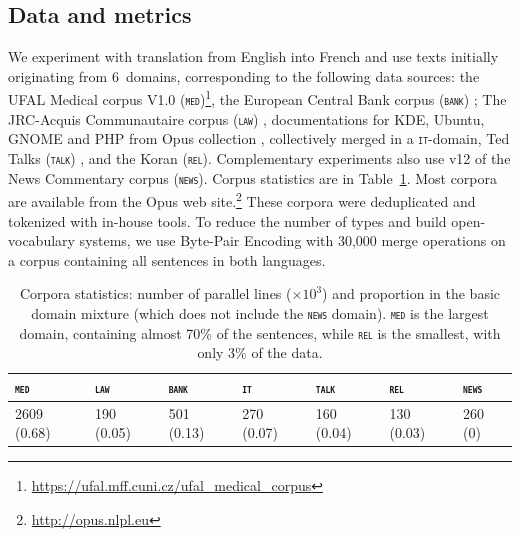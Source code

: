 \documentclass[11pt,a4paper]{article}
\newcommand{\domain}[1]{\texttt{\textsc{#1}}}
\begin{document}
\subsection{Data and metrics \label{ssec:corpora}}
We experiment with translation from English into French and use texts initially originating from 6~domains, corresponding to the following data sources: the UFAL Medical corpus V1.0 (\domain{med})\footnote{\url{https://ufal.mff.cuni.cz/ufal_medical_corpus}}, the European Central Bank corpus (\domain{bank}) \cite{Tiedemann12parallel}; The JRC-Acquis Communautaire corpus (\domain{law}) \cite{Steinberger06acquis}, documentations for KDE, Ubuntu, GNOME and PHP from Opus collection \cite{Tiedemann09news}, collectively merged in a \domain{it}-domain, Ted Talks (\domain{talk}) \cite{Cettolo12wit}, and the Koran (\domain{rel}). Complementary experiments also use v12 of the News Commentary corpus (\domain{news}). Corpus statistics are in Table~\ref{tab:Corpora-en-fr}.  Most corpora are available from the Opus web site.\footnote{\url{http://opus.nlpl.eu}} These corpora were deduplicated and tokenized with in-house tools. To reduce the number of types and build open-vocabulary systems, we use Byte-Pair Encoding \cite{Sennrich16BPE} with 30,000 merge operations on a corpus containing all sentences in both languages.%

\begin{table}[htbp]
  \centering
  \begin{tabular}{ |lllllll|} %
    \hline
    \domain{med} & \domain{law} & \domain{bank} & \domain{it} & \domain{talk} & \domain{rel} & \domain{news} \\
    \hline
    2609 (0.68) & 190 (0.05)  & 501 (0.13) & 270 (0.07) & 160 (0.04) & 130 (0.03) & 260 (0) \\
    \hline
  \end{tabular}
\caption{Corpora statistics: number of parallel lines ($\times 10^3$) and proportion in the basic domain mixture (which does not include the \domain{news} domain). \domain{med} is the largest domain, containing almost 70\% of the sentences, while \domain{rel} is the smallest, with only 3\% of the data.}
\label{tab:Corpora-en-fr}
\end{table}
\end{document}
